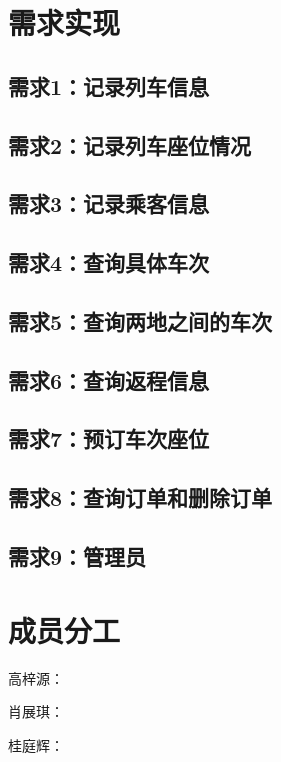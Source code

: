 \documentclass[UTF-8,twoside,cs4size]{ctexart}
\begin{document}
    \section{需求实现}
    \subsection{需求\textbf{1}：记录列车信息}
    
    \subsection{需求\textbf{2}：记录列车座位情况}
    
    \subsection{需求\textbf{3}：记录乘客信息}
    
    \subsection{需求\textbf{4}：查询具体车次}
    
    \subsection{需求\textbf{5}：查询两地之间的车次}
    
    \subsection{需求\textbf{6}：查询返程信息}
    
    \subsection{需求\textbf{7}：预订车次座位}
    
    \subsection{需求\textbf{8}：查询订单和删除订单}
    
    \subsection{需求\textbf{9}：管理员}
    
    \section*{成员分工}
    
    高梓源：
    
    肖展琪：
    
    桂庭辉：
    
\end{document}
